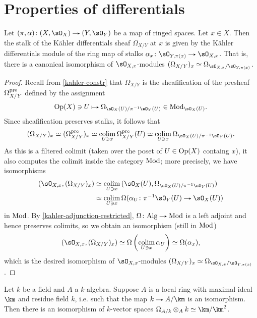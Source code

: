 
\section{Properties of differentials}

\begin{lemma}
  \label{differentials-stalk}
  Let $(\pi,\alpha) \c (X,\sO_X) \to (Y,\sO_Y)$ be a map of ringed spaces. Let $x \in X$. Then the stalk of the K\"ahler differentials sheaf $\Omega_{X/Y}$ at $x$ is given by the K\"ahler differentials module of the ring map of stalks $\alpha_x \c \sO_{Y,\pi(x)} \to \sO_{X,x}$. That is, there is a canonical isomorphism of $\sO_{X,x}$-modules $(\Omega_{X/Y})_x \iso \Omega_{\sO_{X,x}/\sO_{Y,\pi(x)}}$.
\end{lemma}

\begin{proof}
  Recall from \cref{kahler-constr} that $\Omega_{X/Y}$ is the sheafification of the presheaf $\Omega_{X/Y}^{\mathrm{pre}}$ defined by the assignment
  \[
    \Op(X) \ni U \mapsto \Omega_{\sO_X(U)/\pi^{-1}\sO_Y(U)} \in \Mod_{\sO_X(U)}.
  \]
  Since sheafification preserves stalks, it follows that
  \[
    (\Omega_{X/Y})_x
    \iso (\Omega_{X/Y}^\pre)_x
    \iso \colim_{U \ni x} \Omega_{X/Y}^\pre(U)
    \iso \colim_{U \ni x} \Omega_{\sO_X(U)/\pi^{-1}\sO_Y(U)}.
  \]
  As this is a filtered colimit (taken over the poset of $U \in \mathrm{Op}(X)$ containg $x$), it also computes the colimit inside the category $\mathrm{Mod}$; more precisely, we have isomorphisms
  \begin{align*}
    (\sO_{X,x}, (\Omega_{X/Y})_x) &\iso
    \colim_{U \ni x} {(\sO_X(U), \Omega_{\sO_X(U)/\pi^{-1}\sO_Y(U)})} \\ &\iso
    \colim_{U \ni x} \Omega(\alpha_U \c \pi^{-1}\sO_Y(U) \to \sO_X(U))
  \end{align*}
  in $\mathrm{Mod}$. By \cref{kahler-adjunction-restricted}, $\Omega \c \Alg \to \Mod$ is a left adjoint and hence preserves colimits, so we obtain an isomorphism (still in $\mathrm{Mod}$)
  \[
    (\sO_{X,x}, (\Omega_{X/Y})_x) \iso
    \Omega\l(\colim_{U \ni x} \alpha_U\r) \iso
    \Omega(\alpha_x),
  \]
  which is the desired isomorphism of $\sO_{X,x}$-modules $(\Omega_{X/Y})_x \iso \Omega_{\sO_{X,x}/\sO_{Y,\pi(x)}}$.
\end{proof}

\begin{lemma}
  Let $k$ be a field and $A$ a $k$-algebra. Suppose $A$ is a local ring with maximal ideal $\km$ and residue field $k$, i.e. such that the map $k \to A/\km$ is an isomorphism. Then there is an isomorphism of $k$-vector spaces $\Omega_{A/k} \otimes_A k \iso \km/\km^2$.
\end{lemma}




% 
% 


